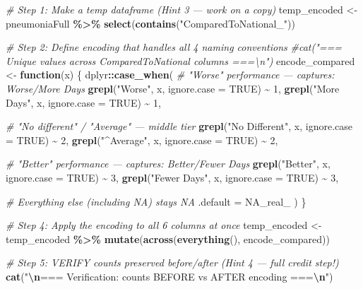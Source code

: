 \documentclass[
]{article}
\newenvironment{Shaded}{\begin{snugshade}}{\end{snugshade}}
\newcommand{\AttributeTok}[1]{\textcolor[rgb]{0.13,0.29,0.53}{#1}}
\newcommand{\CommentTok}[1]{\textcolor[rgb]{0.56,0.35,0.01}{\textit{#1}}}
\newcommand{\ConstantTok}[1]{\textcolor[rgb]{0.56,0.35,0.01}{#1}}
\newcommand{\ControlFlowTok}[1]{\textcolor[rgb]{0.13,0.29,0.53}{\textbf{#1}}}
\newcommand{\DecValTok}[1]{\textcolor[rgb]{0.00,0.00,0.81}{#1}}
\newcommand{\FunctionTok}[1]{\textcolor[rgb]{0.13,0.29,0.53}{\textbf{#1}}}
\newcommand{\NormalTok}[1]{#1}
\newcommand{\OtherTok}[1]{\textcolor[rgb]{0.56,0.35,0.01}{#1}}
\newcommand{\SpecialCharTok}[1]{\textcolor[rgb]{0.81,0.36,0.00}{\textbf{#1}}}
\newcommand{\StringTok}[1]{\textcolor[rgb]{0.31,0.60,0.02}{#1}}
\begin{document}
\begin{Shaded}
\begin{Highlighting}[]
\CommentTok{\# Step 1: Make a temp dataframe (Hint 3 — work on a copy)}
\NormalTok{temp\_encoded }\OtherTok{\textless{}{-}}\NormalTok{ pneumoniaFull }\SpecialCharTok{\%\textgreater{}\%}
    \FunctionTok{select}\NormalTok{(}\FunctionTok{contains}\NormalTok{(}\StringTok{"ComparedToNational\_"}\NormalTok{))}

\CommentTok{\# Step 2: Define encoding that handles all 4 naming conventions}
\CommentTok{\#cat("=== Unique values across ComparedToNational columns ===\textbackslash{}n")}
\NormalTok{encode\_compared }\OtherTok{\textless{}{-}} \ControlFlowTok{function}\NormalTok{(x) \{}
\NormalTok{    dplyr}\SpecialCharTok{::}\FunctionTok{case\_when}\NormalTok{(}
        \CommentTok{\# "Worse" performance — captures: Worse/More Days}
        \FunctionTok{grepl}\NormalTok{(}\StringTok{"Worse"}\NormalTok{,     x, }\AttributeTok{ignore.case =} \ConstantTok{TRUE}\NormalTok{) }\SpecialCharTok{\textasciitilde{}} \DecValTok{1}\NormalTok{,}
        \FunctionTok{grepl}\NormalTok{(}\StringTok{"More Days"}\NormalTok{, x, }\AttributeTok{ignore.case =} \ConstantTok{TRUE}\NormalTok{) }\SpecialCharTok{\textasciitilde{}} \DecValTok{1}\NormalTok{,}
        
        \CommentTok{\# "No different" / "Average" — middle tier}
        \FunctionTok{grepl}\NormalTok{(}\StringTok{"No Different"}\NormalTok{, x, }\AttributeTok{ignore.case =} \ConstantTok{TRUE}\NormalTok{) }\SpecialCharTok{\textasciitilde{}} \DecValTok{2}\NormalTok{,}
        \FunctionTok{grepl}\NormalTok{(}\StringTok{"\^{}Average"}\NormalTok{,     x, }\AttributeTok{ignore.case =} \ConstantTok{TRUE}\NormalTok{) }\SpecialCharTok{\textasciitilde{}} \DecValTok{2}\NormalTok{,}
        
        \CommentTok{\# "Better" performance — captures: Better/Fewer Days}
        \FunctionTok{grepl}\NormalTok{(}\StringTok{"Better"}\NormalTok{,     x, }\AttributeTok{ignore.case =} \ConstantTok{TRUE}\NormalTok{) }\SpecialCharTok{\textasciitilde{}} \DecValTok{3}\NormalTok{,}
        \FunctionTok{grepl}\NormalTok{(}\StringTok{"Fewer Days"}\NormalTok{, x, }\AttributeTok{ignore.case =} \ConstantTok{TRUE}\NormalTok{) }\SpecialCharTok{\textasciitilde{}} \DecValTok{3}\NormalTok{,}
        
        \CommentTok{\# Everything else (including NA) stays NA}
        \AttributeTok{.default =} \ConstantTok{NA\_real\_}
\NormalTok{    )}
\NormalTok{\}}


\CommentTok{\# Step 4: Apply the encoding to all 6 columns at once}
\NormalTok{temp\_encoded }\OtherTok{\textless{}{-}}\NormalTok{ temp\_encoded }\SpecialCharTok{\%\textgreater{}\%}
    \FunctionTok{mutate}\NormalTok{(}\FunctionTok{across}\NormalTok{(}\FunctionTok{everything}\NormalTok{(), encode\_compared))}

\CommentTok{\# Step 5: VERIFY counts preserved before/after (Hint 4 — full credit step!)}
\FunctionTok{cat}\NormalTok{(}\StringTok{"}\SpecialCharTok{\textbackslash{}n}\StringTok{=== Verification: counts BEFORE vs AFTER encoding ===}\SpecialCharTok{\textbackslash{}n}\StringTok{"}\NormalTok{)}
\end{Highlighting}
\end{Shaded}
\end{document}
